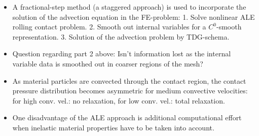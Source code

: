 \documentclass{article}
\begin{document}
\begin{itemize}
\item A fractional-step method (a staggered approach) is used to incorporate the solution of the advection equation in the FE-problem: 1. Solve nonlinear ALE rolling contact problem. 2. Smooth out internal variables for a  $C^0$-smooth representation. 3. Solution of the advection problem by TDG-schema.
\item Question regarding part 2 above: Isn't information lost as the internal variable data is smoothed out in coarser regions of the mesh?
\item As material particles are convected through the contact region, the contact pressure distribution becomes asymmetric for medium convective velocities: for high conv. vel.: no relaxation, for low conv. vel.: total relaxation.
\item One disadvantage of the ALE approach is additional computational effort when inelastic material properties have to be taken into account.
\end{itemize}
\end{document}
